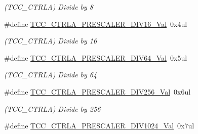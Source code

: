 \begin{DoxyCompactItemize}
\begin{DoxyCompactList}\small\item\em (T\+C\+C\+\_\+\+C\+T\+R\+L\+A) Divide by 8 \end{DoxyCompactList}\item 
\hypertarget{group___s_a_m_l21___t_c_c_ga46a957fcc978f04368174f8ed3aabc6a}{}\#define \hyperlink{group___s_a_m_l21___t_c_c_ga46a957fcc978f04368174f8ed3aabc6a}{T\+C\+C\+\_\+\+C\+T\+R\+L\+A\+\_\+\+P\+R\+E\+S\+C\+A\+L\+E\+R\+\_\+\+D\+I\+V16\+\_\+\+Val}~0x4ul\label{group___s_a_m_l21___t_c_c_ga46a957fcc978f04368174f8ed3aabc6a}

\begin{DoxyCompactList}\small\item\em (T\+C\+C\+\_\+\+C\+T\+R\+L\+A) Divide by 16 \end{DoxyCompactList}\item 
\hypertarget{group___s_a_m_l21___t_c_c_ga6daeff90ce71f7388fd83f92cb070c81}{}\#define \hyperlink{group___s_a_m_l21___t_c_c_ga6daeff90ce71f7388fd83f92cb070c81}{T\+C\+C\+\_\+\+C\+T\+R\+L\+A\+\_\+\+P\+R\+E\+S\+C\+A\+L\+E\+R\+\_\+\+D\+I\+V64\+\_\+\+Val}~0x5ul\label{group___s_a_m_l21___t_c_c_ga6daeff90ce71f7388fd83f92cb070c81}

\begin{DoxyCompactList}\small\item\em (T\+C\+C\+\_\+\+C\+T\+R\+L\+A) Divide by 64 \end{DoxyCompactList}\item 
\hypertarget{group___s_a_m_l21___t_c_c_ga5a43c8a16e6c71c3baf6e2250f40d71e}{}\#define \hyperlink{group___s_a_m_l21___t_c_c_ga5a43c8a16e6c71c3baf6e2250f40d71e}{T\+C\+C\+\_\+\+C\+T\+R\+L\+A\+\_\+\+P\+R\+E\+S\+C\+A\+L\+E\+R\+\_\+\+D\+I\+V256\+\_\+\+Val}~0x6ul\label{group___s_a_m_l21___t_c_c_ga5a43c8a16e6c71c3baf6e2250f40d71e}

\begin{DoxyCompactList}\small\item\em (T\+C\+C\+\_\+\+C\+T\+R\+L\+A) Divide by 256 \end{DoxyCompactList}\item 
\hypertarget{group___s_a_m_l21___t_c_c_gafd5fb4af4aaf8376cf50e5eb6ab22b17}{}\#define \hyperlink{group___s_a_m_l21___t_c_c_gafd5fb4af4aaf8376cf50e5eb6ab22b17}{T\+C\+C\+\_\+\+C\+T\+R\+L\+A\+\_\+\+P\+R\+E\+S\+C\+A\+L\+E\+R\+\_\+\+D\+I\+V1024\+\_\+\+Val}~0x7ul\label{group___s_a_m_l21___t_c_c_gafd5fb4af4aaf8376cf50e5eb6ab22b17}


\end{DoxyCompactItemize}
